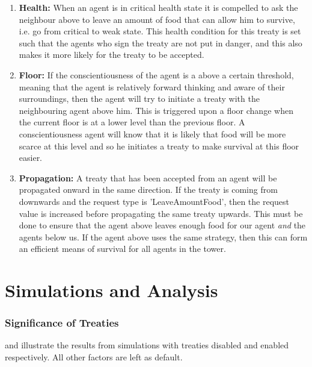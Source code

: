 \begin{enumerate}
    \item \textbf{Health:} When an agent is in critical health state it is compelled to ask the neighbour above to leave an amount of food that can allow him to survive, i.e. go from critical to weak state. This health condition for this treaty is set such that the agents who sign the treaty are not put in danger, and this also makes it more likely for the treaty to be accepted.
    
    \item \textbf{Floor:} If the conscientiousness of the agent is a above a certain threshold, meaning that the agent is relatively forward thinking and aware of their surroundings, then the agent will try to initiate a treaty with the neighbouring agent above him. This is triggered upon a floor change when the current floor is at a lower level than the previous floor. A conscientiousness agent will know that it is likely that food will be more scarce at this level and so he initiates a treaty to make survival at this floor easier.

    \item \textbf{Propagation:} A treaty that has been accepted from an agent will be propagated onward in the same direction. If the treaty is coming from downwards and the request type is 'LeaveAmountFood', then the request value is increased before propagating the same treaty upwards. This must be done to ensure that the agent above leaves enough food for our agent \textit{and} the agents below us. If the agent above uses the same strategy, then this can form an efficient means of survival for all agents in the tower.
\end{enumerate}

\section{Simulations and Analysis}
\subsubsection{Significance of Treaties}
\label{sec: Simulations and Analysis}
 and  illustrate the results from simulations with treaties disabled and enabled respectively. All other factors are left as default.

